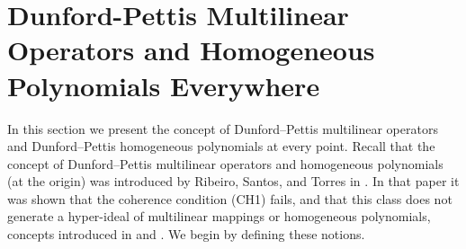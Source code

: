 \documentclass[12 pt]{article}%
\newtheorem{final remark}[theorem]{Final Remark}
\begin{document}
%
%
%
%
%
%


\section{Dunford-Pettis Multilinear Operators and Homogeneous Polynomials Everywhere}\label{DPMOHPEv}

In this section we present the concept of Dunford–Pettis multilinear operators and Dunford–Pettis homogeneous polynomials at every point. Recall that the concept of Dunford–Pettis multilinear operators and homogeneous polynomials (at the origin) was introduced by Ribeiro, Santos, and Torres in \cite{RST22}. In that paper it was shown that the coherence condition (CH1) fails, and that this class does not generate a hyper-ideal of multilinear mappings or homogeneous polynomials, concepts introduced in \cite{BT15} and \cite{BT18}. We begin by defining these notions.
\end{document}
